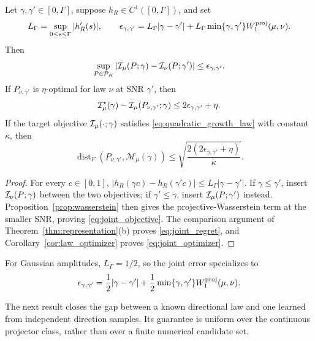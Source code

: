 \begin{corollary}
\label{cor:joint_perturbation}
Let $\gamma,\gamma'\in[0,\Gamma]$, suppose $h_R\in C^1([0,\Gamma])$, and set
\begin{equation}
L_\Gamma=\sup_{0\le s\le\Gamma}|h_R'(s)|,
\qquad
\epsilon_{\gamma,\gamma'}
=L_\Gamma|\gamma-\gamma'|
+L_\Gamma\min\{\gamma,\gamma'\}W_1^{\rm proj}(\mu,\nu).
\label{eq:joint_error}
\end{equation}
Then
\begin{equation}
\sup_{P\in\mathcal P_K}|\mathcal I_\mu(P;\gamma)-\mathcal I_\nu(P;\gamma')|
\le\epsilon_{\gamma,\gamma'}.
\label{eq:joint_objective}
\end{equation}
If $P_{\nu,\gamma'}$ is $\eta$-optimal for law $\nu$ at SNR $\gamma'$, then
\begin{equation}
\mathcal I_\mu^\star(\gamma)-\mathcal I_\mu(P_{\nu,\gamma'};\gamma)
\le2\epsilon_{\gamma,\gamma'}+\eta.
\label{eq:joint_regret}
\end{equation}
If the target objective $\mathcal I_\mu(\cdot;\gamma)$ satisfies
\eqref{eq:quadratic_growth_law} with constant $\kappa$, then
\begin{equation}
\operatorname{dist}_F(P_{\nu,\gamma'},\mathcal M_\mu(\gamma))
\le\sqrt{\frac{2(2\epsilon_{\gamma,\gamma'}+\eta)}{\kappa}}.
\label{eq:joint_optimizer}
\end{equation}
\end{corollary}
\begin{proof}
For every $c\in[0,1]$,
$|h_R(\gamma c)-h_R(\gamma'c)|\le L_\Gamma|\gamma-\gamma'|$.
If $\gamma\le\gamma'$, insert $\mathcal I_\nu(P;\gamma)$ between the two objectives;
if $\gamma'\le\gamma$, insert $\mathcal I_\mu(P;\gamma')$ instead.
Proposition~\ref{prop:wasserstein} then gives the projective-Wasserstein term at the
smaller SNR, proving \eqref{eq:joint_objective}. The comparison argument of
Theorem~\ref{thm:representation}(b) proves \eqref{eq:joint_regret}, and
Corollary~\ref{cor:law_optimizer} proves \eqref{eq:joint_optimizer}.
\end{proof}

For Gaussian amplitudes, $L_\Gamma=1/2$, so the joint error specializes to
\begin{equation}
\epsilon_{\gamma,\gamma'}
= \frac12|\gamma-\gamma'|
+\frac12\min\{\gamma,\gamma'\}W_1^{\rm proj}(\mu,\nu).
\label{eq:joint_gaussian}
\end{equation}

The next result closes the gap between a known directional law and one
learned from independent direction samples. Its guarantee is uniform over
the continuous projector class, rather than over a finite numerical
candidate set.

